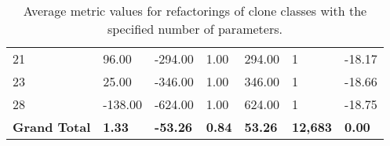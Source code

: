 \begin{appendices}
\begin{table}[H]
{\begin{tabular}{@{}lllllll@{}}
21 & 96.00 & -294.00 & 1.00 & 294.00 & 1 & -18.17 \\
23 & 25.00 & -346.00 & 1.00 & 346.00 & 1 & -18.66 \\
28 & -138.00 & -624.00 & 1.00 & 624.00 & 1 & -18.75 \\ \midrule
\textbf{Grand Total} & \textbf{1.33} & \textbf{-53.26} & \textbf{0.84} & \textbf{53.26} & \textbf{12,683} & \textbf{0.00} \\ \bottomrule
\end{tabular}%
}
\caption{Average metric values for refactorings of clone classes with the specified number of parameters.}
\label{tab:full-arguments}
\end{table}

\end{appendices}

